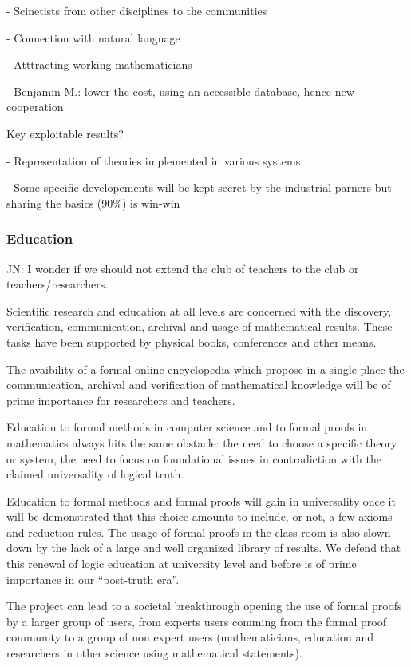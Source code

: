 - Scinetists from other disciplines to the communities

- Connection with natural language 

- Atttracting working mathematicians

- {\color{red} Benjamin M.}: lower the cost, using an accessible
database, hence new cooperation

{\color{red} Key exploitable results?}

- Representation of theories implemented in various systems

- Some specific developements will be kept secret by the industrial parners
but sharing the basics  (90\%) is win-win


\subsubsection{Education}

{\color{red} JN: I wonder if we should not extend the club of teachers to the club or teachers/researchers.}

Scientific research and education at all levels are concerned with the discovery, verification, communication, archival and usage of mathematical results.
These tasks have been supported by physical books, conferences and other means.

The avaibility of a formal online encyclopedia which propose in a single place the communication, archival and verification of mathematical  knowledge will be of prime importance for researchers and teachers.

Education to formal methods in computer science and to formal proofs
in mathematics always hits the same obstacle: the need to choose a
specific theory or system, the need to focus on foundational issues in contradiction with the claimed universality of logical truth. 

Education to formal methods and formal proofs will gain in universality once it will be demonstrated that this choice amounts to include, or not, a few axioms and reduction
rules. 
The usage of formal proofs in the class room is also slown down by the lack of a large and well organized library of results.
We defend that this renewal of logic education at university level and before is of prime importance in our ``post-truth era''.

The project can lead to a societal breakthrough opening the use of formal proofs by a larger group of users, from experts users comming from the formal proof community  to a group of non expert users (mathematicians, education and researchers in other science using mathematical statements). 


